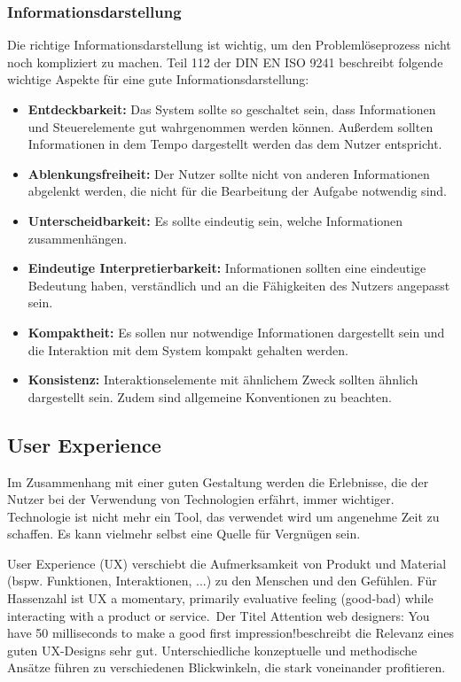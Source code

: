 \subsubsection*{Informationsdarstellung}
Die richtige Informationsdarstellung ist wichtig, um den Problemlöseprozess nicht noch kompliziert zu machen. Teil 112 der DIN EN ISO 9241 beschreibt folgende wichtige Aspekte für eine gute Informationsdarstellung:
\begin{itemize}
\item \textbf{Entdeckbarkeit:} Das System sollte so geschaltet sein, dass Informationen und Steuerelemente gut wahrgenommen werden können. Außerdem sollten Informationen in dem Tempo dargestellt werden das dem Nutzer entspricht.
\item \textbf{Ablenkungsfreiheit:} Der Nutzer sollte nicht von anderen Informationen abgelenkt werden, die nicht für die Bearbeitung der Aufgabe notwendig sind.
\item \textbf{Unterscheidbarkeit:} Es sollte eindeutig sein, welche Informationen zusammenhängen.
\item \textbf{Eindeutige Interpretierbarkeit:} Informationen sollten eine eindeutige Bedeutung haben, verständlich und an die Fähigkeiten des Nutzers angepasst sein.
\item \textbf{Kompaktheit:} Es sollen nur notwendige Informationen dargestellt sein und die Interaktion mit dem System kompakt gehalten werden.
\item \textbf{Konsistenz:} Interaktionselemente mit ähnlichem Zweck sollten ähnlich dargestellt sein. Zudem sind allgemeine Konventionen zu beachten.
\end{itemize}

\subsection{User Experience}
Im Zusammenhang mit einer guten Gestaltung werden die Erlebnisse, die der Nutzer bei der Verwendung von Technologien erfährt, immer wichtiger. Technologie ist nicht mehr ein Tool, das verwendet wird um angenehme Zeit zu schaffen. Es kann vielmehr selbst eine Quelle für Vergnügen sein.

User Experience (UX) verschiebt die Aufmerksamkeit von Produkt und Material (bspw. Funktionen, Interaktionen, ...) zu den Menschen und den Gefühlen. Für Hassenzahl ist UX \glqq a momentary, primarily evaluative feeling (good-bad) while interacting with a product or service.\grqq \ Der Titel \glqq Attention web designers: You have 50 milliseconds to make a good first impression!\grqq beschreibt die Relevanz eines guten UX-Designs sehr gut. Unterschiedliche konzeptuelle und methodische Ansätze führen zu verschiedenen Blickwinkeln, die stark voneinander profitieren.

